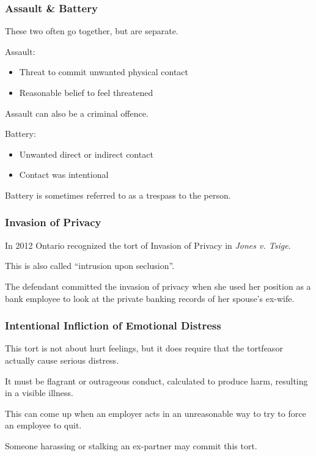 \begin{frame}
\frametitle{Assault \& Battery}

These two often go together, but are separate.

Assault:\\
\begin{itemize}
	\item Threat to commit unwanted physical contact
	\item Reasonable belief to feel threatened
\end{itemize}

Assault can also be a criminal offence.

Battery:\\
\begin{itemize}
	\item Unwanted direct or indirect contact
	\item Contact was intentional
\end{itemize}

Battery is sometimes referred to as a trespass to the person.

\end{frame}



\begin{frame}
\frametitle{Invasion of Privacy}

In 2012 Ontario recognized the tort of Invasion of Privacy in \textit{Jones v. Tsige}.

This is also called ``intrusion upon seclusion''.

The defendant committed the invasion of privacy when she used her position as a bank employee to look at the private banking records of her spouse's ex-wife.

\end{frame}



\begin{frame}
\frametitle{Intentional Infliction of Emotional Distress}

This tort is not about hurt feelings, but it does require that the tortfeasor actually cause serious distress.

It must be flagrant or outrageous conduct, calculated to produce harm, resulting in a visible illness. 

This can come up when an employer acts in an unreasonable way to try to force an employee to quit. 

Someone harassing or stalking an ex-partner may commit this tort.


\end{frame}



